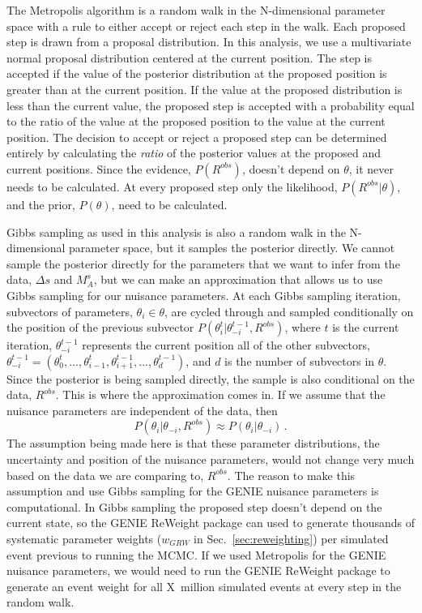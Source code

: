     The Metropolis algorithm is a random walk in the N-dimensional parameter
    space with a rule to either accept or reject each step in the walk. Each
    proposed step is drawn from a proposal distribution.  In this analysis, we
    use a multivariate normal proposal distribution centered at the current
    position.  The step is accepted if the value of the posterior distribution
    at the proposed position is greater than at the current position. If the
    value at the proposed distribution is less than the current value, the
    proposed step is accepted with a probability equal to the ratio of the
    value at the proposed position to the value at the current position. The
    decision to accept or reject a proposed step can be determined entirely by
    calculating the \textit{ratio} of the posterior values at the proposed and
    current positions. Since the evidence, $P(R^{obs})$, doesn't depend on
    $\theta$, it never needs to be calculated. At every proposed step only the
    likelihood, $P(R^{obs}|\theta)$, and the prior, $P(\theta)$, need to be
    calculated.

    Gibbs sampling as used in this analysis is also a random walk in the
    N-dimensional parameter space, but it samples the posterior directly. We
    cannot sample the posterior directly for the parameters that we want to
    infer from the data, $\Delta s$ and $M_A^s$, but we can make an
    approximation that allows us to use Gibbs sampling for our nuisance
    parameters. At each Gibbs sampling iteration, subvectors of parameters,
    $\theta_i \in \theta$, are cycled through and sampled conditionally on the
    position of the previous subvector
    $P(\theta_i^t|\theta_{-i}^{t-1},R^{obs})$, where $t$ is the current
    iteration, $\theta_{-i}^{t-1}$ represents the current position all of the
    other subvectors, $\theta_{-i}^{t-1} =
    (\theta_0^t,...,\theta_{i-1}^t,\theta_{i+1}^{t-1},...,\theta_d^{t-1})$, and
    $d$ is the number of subvectors in $\theta$.  Since the posterior is being
    sampled directly, the sample is also conditional on the data, $R^{obs}$.
    This is where the approximation comes in. If we assume that the nuisance
    parameters are independent of the data, then
    \begin{equation}\label{eq:gibbsstep}
      P(\theta_i|\theta_{-i},R^{obs}) \approx P(\theta_i|\theta_{-i}) \,.
    \end{equation}
    The assumption being made here is that these parameter distributions, the
    uncertainty and position of the nuisance parameters, would not change very
    much based on the data we are comparing to, $R^{obs}$. The reason to make
    this assumption and use Gibbs sampling for the GENIE nuisance parameters is
    computational. In Gibbs sampling the proposed step doesn't depend on the
    current state, so the GENIE ReWeight package can used to generate thousands
    of systematic parameter weights ($w_{GRW}$ in Sec.~\ref{sec:reweighting})
    per simulated event previous to running the MCMC. If we used Metropolis for
    the GENIE nuisance parameters, we would need to run the GENIE ReWeight
    package to generate an event weight for all X~million simulated events at
    every step in the random walk.

